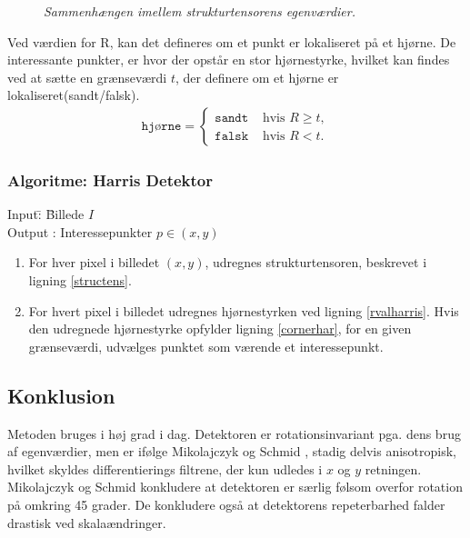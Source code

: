 \begin{enumerate}
{\begin{figure}[H]
     \vspace{-1em}
    \begin{center}    
       \caption{{\footnotesize \textit{Sammenhængen imellem strukturtensorens egenværdier.}}}
    \label{fig:egen}
     \end{center}
     \vspace{-2.5em}
  \end{figure} \noindent
Ved værdien for R, kan det defineres om et punkt er lokaliseret på et hjørne. De interessante punkter, er hvor der opstår en stor hjørnestyrke, hvilket kan findes ved at sætte en grænseværdi $t$, der definere om et hjørne er lokaliseret(sandt/falsk).
\begin{equation}
\begin{split}
\texttt{hjørne} = 
\begin{cases}
\texttt{sandt}& \text{hvis } R\geq t, \\
\texttt{falsk }& \text{hvis } R < t.
\end{cases}
\end{split}
\label{cornerhar}
\end{equation}
}
\end{enumerate}
\subsubsection*{Algoritme: Harris Detektor}
\begin{tabbing}
Input\quad \= : \= Billede $I$\\
Output \text{ } \> : \> Interessepunkter $p \in (x,y)$
\end{tabbing}
\begin{enumerate}
\item{For hver pixel i billedet $(x,y)$, udregnes strukturtensoren, beskrevet i ligning \eqref{structens}.}
\item{For hvert pixel i billedet udregnes hjørnestyrken ved ligning \eqref{rvalharris}.  Hvis den udregnede hjørnestyrke opfylder ligning \ref{cornerhar}, for en given grænseværdi, udvælges punktet som værende et interessepunkt.}
\end{enumerate}
\subsection*{Konklusion}
Metoden bruges i høj grad i dag. Detektoren er rotationsinvariant pga. dens brug af egenværdier, men er ifølge Mikolajczyk og Schmid \cite{eval}, stadig delvis anisotropisk, hvilket skyldes differentierings filtrene, der kun udledes i $x$ og $y$ retningen. Mikolajczyk og Schmid \cite{eval1} konkludere at detektoren er særlig følsom overfor rotation på omkring 45 grader. De konkludere også at detektorens repeterbarhed falder drastisk ved skalaændringer.